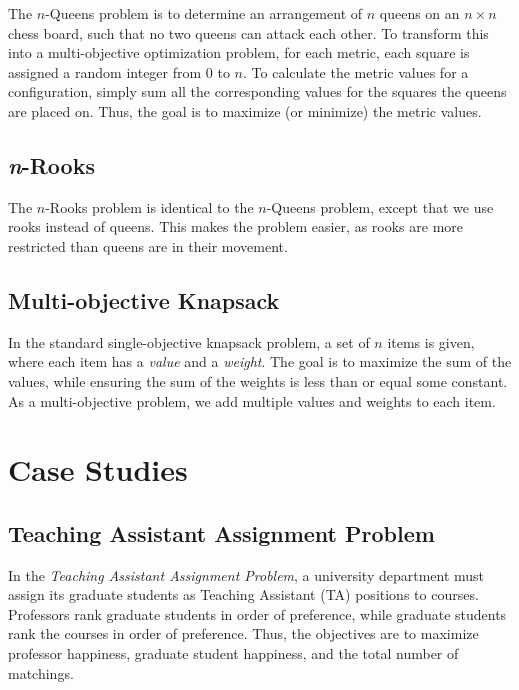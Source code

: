 \documentclass[11pt]{article}
\begin{document}
The $n$-Queens problem is to determine an arrangement of $n$
queens on an $n \times n$ chess board, such that no two queens can
attack each other. To transform this into a multi-objective
optimization problem, for each metric, each square is assigned a random
integer from $0$ to $n$. To calculate the metric values for a
configuration, simply sum all the corresponding values for the squares
the queens are placed on. Thus, the goal is to maximize (or minimize)
the metric values.

\subsection{\textit{n}-Rooks}

The $n$-Rooks problem is identical to the $n$-Queens problem, except
that we use rooks instead of queens. This makes the problem easier, as
rooks are more restricted than queens are in their movement.

\subsection{Multi-objective Knapsack}

In the standard single-objective knapsack problem, a set of $n$ items
is given, where each item has a \textit{value} and a \textit{weight}.
The goal is to maximize the sum of the values, while ensuring the sum
of the weights is less than or equal some constant. As a
multi-objective problem, we add multiple values and weights to each
item.

\section{Case Studies}

\subsection{Teaching Assistant Assignment Problem}

In the \textit{Teaching Assistant Assignment Problem}, a university
department must assign its graduate students as Teaching Assistant (TA)
positions to courses. Professors rank graduate students in order of
preference, while graduate students rank the courses in order of
preference. Thus, the objectives are to maximize professor happiness,
graduate student happiness, and the total number of matchings.
\end{document}
